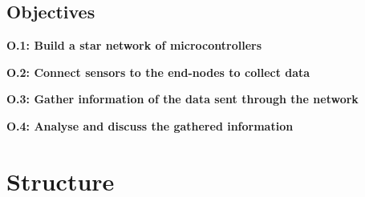 \subsection{Objectives}

\noindent \textbf{O.1: Build a star network of microcontrollers}

\noindent\textbf{O.2: Connect sensors to the end-nodes to collect data}

\noindent\textbf{O.3: Gather information of the data sent through the network}

\noindent\textbf{O.4: Analyse and discuss the gathered information}

\section{Structure}